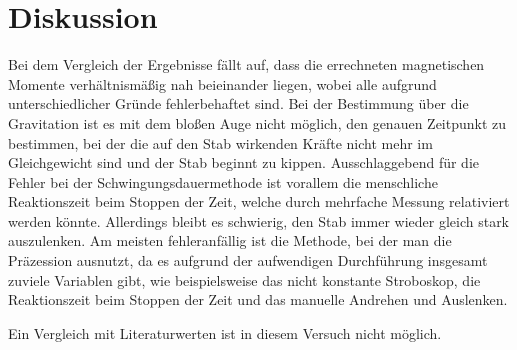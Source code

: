 \section{Diskussion}
\label{sec:Diskussion}


Bei dem Vergleich der Ergebnisse fällt auf, dass die errechneten magnetischen Momente 
verhältnismäßig nah beieinander liegen, wobei alle aufgrund unterschiedlicher Gründe 
fehlerbehaftet sind. Bei der Bestimmung über die Gravitation ist es mit dem bloßen Auge nicht möglich, 
den genauen Zeitpunkt zu bestimmen, bei der die auf den Stab wirkenden Kräfte nicht mehr im 
Gleichgewicht sind und der Stab beginnt zu kippen. Ausschlaggebend für die Fehler bei der Schwingungsdauermethode 
ist vorallem die menschliche Reaktionszeit beim Stoppen der Zeit, welche durch mehrfache Messung relativiert 
werden könnte. Allerdings bleibt es schwierig, den Stab immer wieder gleich stark auszulenken.
Am meisten fehleranfällig ist die Methode, bei der man die Präzession ausnutzt, da es aufgrund der aufwendigen 
Durchführung insgesamt zuviele Variablen gibt, wie beispielsweise das nicht konstante Stroboskop, die 
Reaktionszeit beim Stoppen der Zeit und das manuelle Andrehen und Auslenken.

Ein Vergleich mit Literaturwerten ist in diesem Versuch nicht möglich.